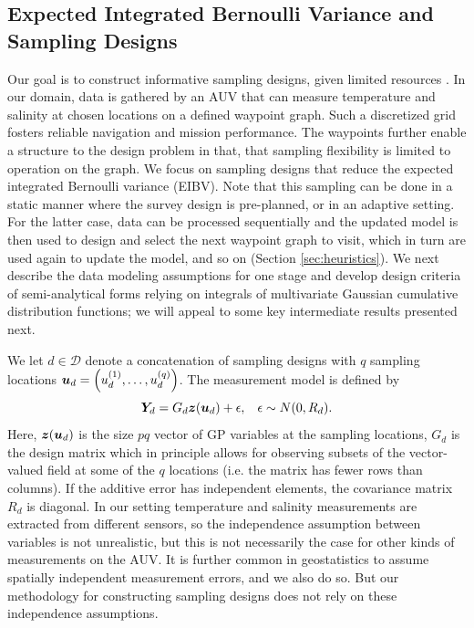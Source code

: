 \documentclass[aoas]{imsart}
\begin{document}
\subsection{Expected Integrated Bernoulli Variance and Sampling Designs}
\label{sec:EIBV}

Our goal is to construct informative sampling designs, given limited
resources . In our domain, data is gathered by an AUV
that can measure temperature and salinity at chosen locations on a
defined waypoint graph. Such a discretized grid fosters reliable
navigation and mission performance. The waypoints further enable a
structure to the design problem in that, that sampling flexibility is
limited to operation on the graph. %
We focus on sampling designs that reduce the expected integrated
Bernoulli variance (EIBV). Note that this sampling can be done in a
static manner where the survey design is pre-planned, or in an
adaptive setting. For the latter case, data can be processed
sequentially and the updated model is then used to design and select
the next waypoint graph to visit, which in turn are used again to
update the model, and so on (Section \ref{sec:heuristics}). We next
describe the data modeling assumptions for one stage and develop
design criteria of semi-analytical forms relying on integrals of
multivariate Gaussian cumulative distribution functions; we will
appeal to some key intermediate results presented next.

We let $d \in \mathcal{D}$ denote a concatenation of sampling designs with $q$ sampling locations ${\boldsymbol u}_d=\left(u_d^{(1)},\ldots, u_d^{(q)}\right)$. The
measurement model is defined by 
\begin{equation}\label{eq:meas}
    \bY_d=G_d \bz(\bu_d) + \epsilon, \hspace{3mm} \epsilon \sim N(0,R_d).
\end{equation}
Here, ${\boldsymbol z}({\boldsymbol u}_d)$ is the size $pq$ vector of GP variables at the
sampling locations, $G_d$ is the design matrix which in principle
allows for observing subsets of the vector-valued field at some of the
$q$ locations (i.e. the matrix has fewer rows than columns). If the
additive error has independent elements, the covariance matrix $R_d$
is diagonal. In our setting temperature and salinity measurements are
extracted from different sensors, so the independence assumption
between variables is not unrealistic, but this is not necessarily the
case for other kinds of measurements on the AUV. It is further common
in geostatistics to assume spatially independent measurement errors,
and we also do so. But our methodology for constructing sampling
designs does not rely on these independence assumptions.
\end{document}
